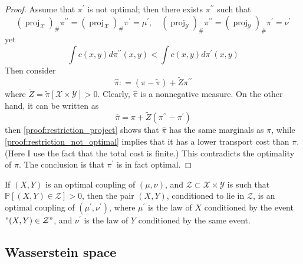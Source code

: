 \begin{proof}
	Assume that \( \pi ^ { \prime } \) is not optimal; then there exists
	\( \pi ^ { \prime \prime } \) such that
	\begin{equation}
	\label{proof:restriction_project}
\left( \operatorname { proj } _ { \mathcal { X } } \right) _ { \# } \pi ^ { \prime \prime } = \left( \operatorname { proj } _ { \mathcal { X } } \right) _ { \# } \pi ^ { \prime } = \mu ^ { \prime } , \quad \left( \operatorname { proj } _ { \mathcal { Y } } \right) _ { \# } \pi ^ { \prime \prime } = \left( \operatorname { proj } _ { \mathcal { Y } } \right) _ { \# } \pi ^ { \prime } = \nu ^ { \prime }
\end{equation}
	yet
	\begin{equation}
	\label{proof:restriction_not_optimal}
\int c ( x , y ) d \pi ^ { \prime \prime } ( x , y ) < \int c ( x , y ) d \pi ^ { \prime } ( x , y )
\end{equation}
	Then consider
	\[ \widehat { \pi } : = ( \pi - \widetilde { \pi } ) + \widetilde { Z } \pi ^ { \prime \prime } \]
	where \( \widetilde { Z } = \widetilde { \pi } [ \mathcal { X } \times \mathcal { Y } ] > 0 . \) Clearly, \( \widehat { \pi } \) is a nonnegative measure. On the
	other hand, it can be written as
	\[ \widehat { \pi } = \pi + \widetilde { Z } \left( \pi ^ { \prime \prime } - \pi ^ { \prime } \right) \]
	then \cref{proof:restriction_project} shows that \( \widehat { \pi } \) has the same marginals as \( \pi \),
	while \cref{proof:restriction_not_optimal} implies that it has a lower transport cost than \( \pi \).
	(Here I use the fact that the total cost is finite.)
	This contradicts the optimality of \( \pi \). The conclusion
	is that \( \pi ^ { \prime } \) is in fact optimal.
\end{proof}

\begin{rmk}
	If \( ( X , Y ) \) is an optimal coupling of \( ( \mu , \nu ) \), and \( \mathcal { Z } \subset \mathcal { X } \times \mathcal { Y } \)
	is such that \( \mathbb { P } [ ( X , Y ) \in \mathcal { Z } ] > 0 \), then the pair \( ( X , Y ) \), conditioned
	to lie in \( \mathcal { Z } \), is an optimal coupling of \( \left( \mu ^ { \prime } , \nu ^ { \prime } \right) \), where \( \mu ^ { \prime } \) is the law of
	\( X \) conditioned by the event \( " ( X , Y ) \in \mathcal { Z } " \), and \( \nu ^ { \prime } \) is the law of \( Y \)
	conditioned by the same event.
\end{rmk}
\subsection{Wasserstein space}

